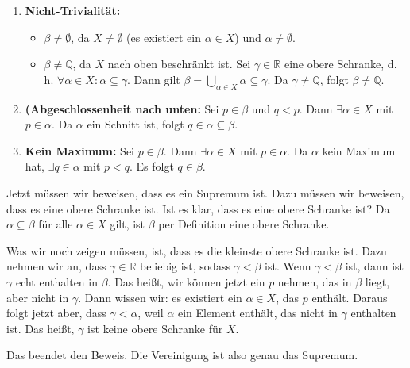 \begin{math-stroke}
\begin{enumerate}[label=\textbf{(D\arabic*)}, start=0]
    \item \textbf{Nicht-Trivialität:} 
    \begin{itemize}
        \item $\beta \neq \emptyset$, da $X \neq \emptyset$ (es existiert ein $\alpha \in X$) und $\alpha \neq \emptyset$.
        \item $\beta \neq \mathbb{Q}$, da $X$ nach oben beschränkt ist. Sei $\gamma \in \mathbb{R}$ eine obere Schranke, d.\,h. $\forall \alpha \in X \colon \alpha \subseteq \gamma$. Dann gilt $\beta = \bigcup_{\alpha \in X} \alpha \subseteq \gamma$. Da $\gamma \neq \mathbb{Q}$, folgt $\beta \neq \mathbb{Q}$.
    \end{itemize}
    \item \textbf{(Abgeschlossenheit nach unten:} Sei $p \in \beta$ und $q < p$. Dann $\exists \alpha \in X$ mit $p \in \alpha$. Da $\alpha$ ein Schnitt ist, folgt $q \in \alpha \subseteq \beta$.
    \item \textbf{Kein Maximum:} Sei $p \in \beta$. Dann $\exists \alpha \in X$ mit $p \in \alpha$. Da $\alpha$ kein Maximum hat, $\exists q \in \alpha$ mit $p < q$. Es folgt $q \in \beta$.
\end{enumerate}
\end{math-stroke}

\begin{spoken-clean}[01:18:15 - 01:21:00]
Jetzt müssen wir beweisen, dass es ein Supremum ist. Dazu müssen wir beweisen, dass es eine obere Schranke ist. Ist es klar, dass es eine obere Schranke ist? Da $\alpha \subseteq \beta$ für alle $\alpha \in X$ gilt, ist $\beta$ per Definition eine obere Schranke.

Was wir noch zeigen müssen, ist, dass es die kleinste obere Schranke ist. Dazu nehmen wir an, dass $\gamma \in \mathbb{R}$ beliebig ist, sodass $\gamma < \beta$ ist. Wenn $\gamma < \beta$ ist, dann ist $\gamma$ echt enthalten in $\beta$. Das heißt, wir können jetzt ein $p$ nehmen, das in $\beta$ liegt, aber nicht in $\gamma$. Dann wissen wir: es existiert ein $\alpha \in X$, das $p$ enthält. Daraus folgt jetzt aber, dass $\gamma < \alpha$, weil $\alpha$ ein Element enthält, das nicht in $\gamma$ enthalten ist. Das heißt, $\gamma$ ist keine obere Schranke für $X$.

Das beendet den Beweis. Die Vereinigung ist also genau das Supremum.
\end{spoken-clean}

